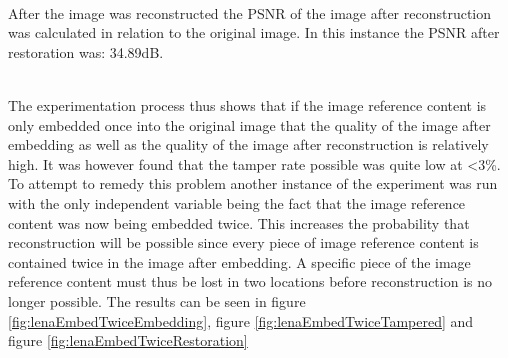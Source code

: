 \documentclass[12pt]{article}
\begin{document}
\hspace{0pt} \\
After the image was reconstructed the PSNR of the image after reconstruction was calculated in relation to the original image.
In this instance the PSNR after restoration was: 34.89dB.

\hspace{0pt} \\
The experimentation process thus shows that if the image reference content is only embedded once into the original image that the quality of the image after embedding as well as the quality of the image after reconstruction is relatively high.
It was however found that the tamper rate possible was quite low at \textless 3\%.
To attempt to remedy this problem another instance of the experiment was run with the only independent variable being the fact that the image reference content was now being embedded twice.
This increases the probability that reconstruction will be possible since every piece of image reference content is contained twice in the image after embedding.
A specific piece of the image reference content must thus be lost in two locations before reconstruction is no longer possible.
The results can be seen in figure \ref{fig:lenaEmbedTwiceEmbedding}, figure \ref{fig:lenaEmbedTwiceTampered} and figure \ref{fig:lenaEmbedTwiceRestoration}
\end{document}
